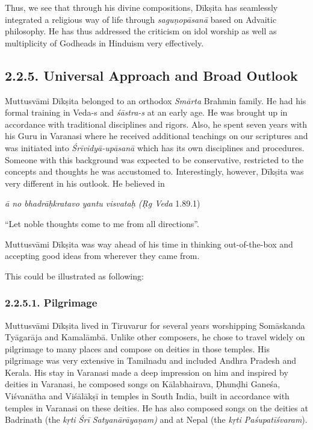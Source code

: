 Thus, we see that through his divine compositions, Dīkṣita has seamlessly integrated a religious way of life through \textit{saguṇopāsanā} based on Advaitic philosophy. He has thus addressed the criticism on idol worship as well as multiplicity of Godheads in Hinduism very effectively.


\subsection*{2.2.5. Universal Approach and Broad Outlook}

Muttusvāmi Dīkṣita belonged to an orthodox \textit{Smārta} Brahmin family. He had his formal training in Veda-s and \textit{śāstra-s} at an early age. He was brought up in accordance with traditional disciplines and rigors. Also, he spent seven years with his Guru in Varanasi where he received additional teachings on our scriptures and was initiated into \textit{Śrīvidyā-upāsanā} which has its own disciplines and procedures. Someone with this background was expected to be conservative, restricted to the concepts and thoughts he was accustomed to. Interestingly, however, Dīkṣita was very different in his outlook. He believed in

\begin{myquote}
\textit{ā no bhadrāḥkratavo yantu visvataḥ (Ṛg Veda} 1.89.1)
\end{myquote}

“Let noble thoughts come to me from all directions”.

Muttusvāmi Dīkṣita was way ahead of his time in thinking out-of-the-box and accepting good ideas from wherever they came from.

This could be illustrated as following:

\subsubsection*{2.2.5.1. Pilgrimage}

Muttusvāmi Dīkṣita lived in Tiruvarur for several years worshipping Somāskanda Tyāgarāja and Kamalāmbā. Unlike other composers, he chose to travel widely on pilgrimage to many places and compose on deities in those temples. His pilgrimage was very extensive in Tamilnadu and included Andhra Pradesh and Kerala. His stay in Varanasi made a deep impression on him and inspired by deities in Varanasi, he composed songs on Kālabhairava, Ḍhunḍhi Ganeśa, Viśvanātha and Viśālākṣī in temples in South India, built in accordance with temples in Varanasi on these deities. He has also composed songs on the deities at Badrinath (the \textit{kṛti Śrī Satyanārāyaṇam)} and at Nepal (the\textit{ kṛti Paśupatīśvaram}).

